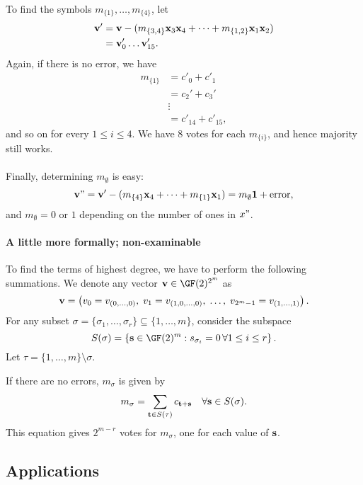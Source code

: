 \documentclass[a4paper, 11pt, openany]{book}
\begin{document}
To find the symbols $m_{\{1\}}, \dots, m_{\{4\}}$, let
\begin{align*}
	{\bf v}' &= {\bf v} - (m_{\{3,4\}}{\bf x}_3 {\bf x}_4 + \dots + m_{\{1,2\}}{\bf x}_1 {\bf x}_2)\\
	&= {\bf v}'_0 \dots {\bf v}'_{15}.
\end{align*}
Again, if there is no error, we have
\begin{align*}
	m_{\{1\}} &= c'_0 + c'_1\\
	&= c_2' + c_3'\\
	&\vdots\\
	&= c'_{14} + c'_{15},
\end{align*}
and so on for every $1 \le i \le 4$. We have 8 votes for each $m_{\{i\}}$, and hence majority still works.\\
~\\
Finally, determining $m_\emptyset$ is easy:
\[
	{\bf v}" = {\bf v}' - (m_{\{4\}} {\bf x}_4 + \dots + m_{\{1\}} {\bf x}_1) = m_\emptyset {\bf 1} + \text{error},
\]
and $m_\emptyset = 0$ or $1$ depending on the number of ones in $x"$.




\paragraph{A little more formally; non-examinable}
To find the terms of highest degree, we have to perform the following summations. We denote any vector ${\bf v} \in \GF(2)^{2^m}$ as
\[
	{\bf v} = \left( v_0 = v_{(0, \dots, 0)}, \; v_1 = v_{(1,0,\dots,0)}, \; \dots, \; v_{2^m - 1} = v_{(1, \dots, 1)} \right).
\]
For any subset $\sigma = \{\sigma_1, \dots, \sigma_r\} \subseteq \{1, \dots, m\}$, consider the subspace
\[
	S(\sigma) = \left\{ {\bf s} \in \GF(2)^m : s_{\sigma_i} = 0 \,\forall 1 \le i \le r \right\}.
\]
Let $\tau = \{1, \dots, m\} \setminus \sigma$.

\begin{theorem}
If there are no errors, $m_\sigma$ is given by
\[
	m_\sigma = \sum_{{\bf t} \in S(\tau)} c_{{\bf t} + {\bf s}} \quad \forall {\bf s} \in S(\sigma).
\]
This equation gives $2^{m-r}$ votes for $m_\sigma$, one for each value of ${\bf s}$.
\end{theorem}




\subsection{Applications}
\end{document}
